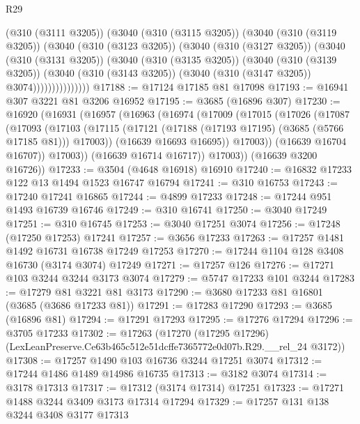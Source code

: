 \begin{lexlean}{R29}
\begin{coremodule}
                (@310 (@3111 @3205))
                (@3040
                  (@310 (@3115 @3205))
                  (@3040
                    (@310 (@3119 @3205))
                    (@3040
                      (@310 (@3123 @3205))
                      (@3040
                        (@310 (@3127 @3205))
                        (@3040
                          (@310 (@3131 @3205))
                          (@3040
                            (@310 (@3135 @3205))
                            (@3040
                              (@310 (@3139 @3205))
                              (@3040
                                (@310 (@3143 @3205))
                                (@3040 (@310 (@3147 @3205)) @3074)))))))))))))))
@17188 := @17124 @17185 @81 @17098
@17193 := @16941 @307 @3221 @81 @3206 @16952
@17195 := @3685 (@16896 @307)
@17230 := @16920
    (@16931
      (@16957
        (@16963
          (@16974
            (@17009
              (@17015
                (@17026
                  (@17087
                    (@17093
                      (@17103
                        (@17115 (@17121 (@17188 (@17193 @17195) (@3685 (@5766 @17185 @81))) @17003))
                        (@16639 @16693 @16695))
                      @17003))
                  (@16639 @16704 @16707))
                @17003))
            (@16639 @16714 @16717))
          @17003))
      (@16639 @3200 @16726))
@17233 := @3504 (@4648 @16918) @16910
@17240 := @16832 @17233 @122 @13 @1494 @1523 @16747 @16794
@17241 := @310 @16753
@17243 := @17240 @17241 @16865
@17244 := @4899 @17233
@17248 := @17244 @951 @1493 @16739 @16746
@17249 := @310 @16741
@17250 := @3040 @17249
@17251 := @310 @16745
@17253 := @3040 @17251 @3074
@17256 := @17248 (@17250 @17253) @17241
@17257 := @3656 @17233
@17263 := @17257 @1481 @1492 @16731 @16738 @17249 @17253
@17270 := @17244 @1104 @128 @3408 @16730 (@3174 @3074) @17249
@17271 := @17257 @126
@17276 := @17271 @103 @3244 @3244 @3173 @3074
@17279 := @5747 @17233 @101 @3244
@17283 := @17279 @81 @3221 @81 @3173
@17290 := @3680 @17233 @81 @16801 (@3685 (@3686 @17233 @81))
@17291 := @17283 @17290
@17293 := @3685 (@16896 @81)
@17294 := @17291 @17293
@17295 := @17276 @17294
@17296 := @3705 @17233
@17302 := @17263
    (@17270 (@17295 @17296) (LexLeanPreserve.Ce63b465c512e51dcffe7365772e0d07b.R29.__rel_24 @3172))
@17308 := @17257 @1490 @103 @16736 @3244 @17251 @3074
@17312 := @17244 @1486 @1489 @14986 @16735
@17313 := @3182 @3074
@17314 := @3178 @17313
@17317 := @17312 (@3174 @17314) @17251
@17323 := @17271 @1488 @3244 @3409 @3173 @17314 @17294
@17329 := @17257 @131 @138 @3244 @3408 @3177 @17313

\end{coremodule}
\end{lexlean}
